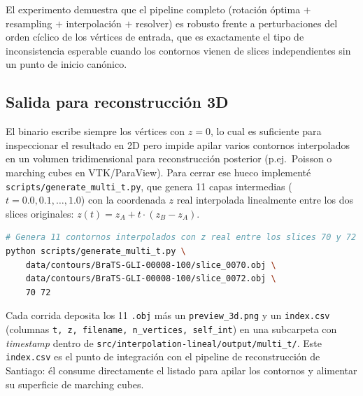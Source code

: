 El experimento demuestra que el pipeline completo
(rotación óptima $+$ resampling $+$ interpolación $+$ resolver) es robusto
frente a perturbaciones del orden cíclico de los vértices de entrada, que es
exactamente el tipo de inconsistencia esperable cuando los contornos vienen
de slices independientes sin un punto de inicio canónico.


\subsection{Salida para reconstrucción 3D}
\label{subsec:multi-t}

El binario escribe siempre los vértices con $z = 0$, lo cual es suficiente
para inspeccionar el resultado en 2D pero impide apilar varios contornos
interpolados en un volumen tridimensional para reconstrucción posterior
(p.ej.\ Poisson o marching cubes en VTK/ParaView). Para cerrar ese hueco
implementé \texttt{scripts/generate\_multi\_t.py}, que genera 11 capas
intermedias ($t = 0.0, 0.1, \ldots, 1.0$) con la coordenada $z$ real
interpolada linealmente entre los dos slices originales:
$z(t) = z_A + t \cdot (z_B - z_A)$.

\begin{lstlisting}[language=bash,basicstyle=\small\ttfamily]
# Genera 11 contornos interpolados con z real entre los slices 70 y 72
python scripts/generate_multi_t.py \
    data/contours/BraTS-GLI-00008-100/slice_0070.obj \
    data/contours/BraTS-GLI-00008-100/slice_0072.obj \
    70 72
\end{lstlisting}

Cada corrida deposita los 11 \texttt{.obj} más un
\texttt{preview\_3d.png} y un \texttt{index.csv} (columnas
\texttt{t, z, filename, n\_vertices, self\_int}) en una subcarpeta con
\emph{timestamp} dentro de \texttt{src/interpolation-lineal/output/multi\_t/}.
Este \texttt{index.csv} es el punto de integración con el pipeline de
reconstrucción de Santiago: él consume directamente el listado para apilar
los contornos y alimentar su superficie de marching cubes.
